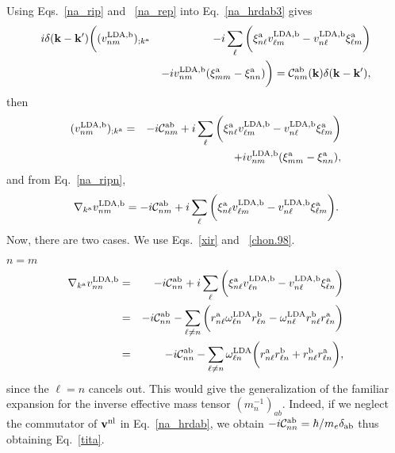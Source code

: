 Using Eqs.~\eqref{na_rip} and ~\eqref{na_rep}
into Eq.~\eqref{na_hrdab3} gives
\begin{eqnarray}\label{na_rapb}
i\delta(\mathbf{k}-\mathbf{k}')
\bigg(
(v^{\mathrm{LDA},\mathrm{b}}_{nm})_{;k^{\mathrm{a}}}
&&
-i
\sum_{\ell}
\bigg(
\xi^{\mathrm{a}}_{n\ell}
v^{\mathrm{LDA},\mathrm{b}}_{\ell m}
-
v^{\mathrm{LDA},\mathrm{b}}_{n\ell}
\xi^{\mathrm{a}}_{\ell m}
\bigg)
\nonumber \\
&&
-i
v^{\mathrm{LDA},\mathrm{b}}_{nm}(\xi^{\mathrm{a}}_{mm}
-
\xi^{\mathrm{a}}_{nn}
)
\bigg)
=
{\mathbf{\cal C}}^{\mathrm{a}\mathrm{b}}_{nm}(\mathbf{k})\delta(\mathbf{k}-\mathbf{k}')
,
\end{eqnarray}
then
\begin{eqnarray}\label{na_rapb2}
(v^{\mathrm{LDA},\mathrm{b}}_{nm})_{;k^{\mathrm{a}}}&=&
-i
{\mathbf{\cal C}}^{\mathrm{a}\mathrm{b}}_{nm}
+i
\sum_{\ell}
\bigg(
\xi^{\mathrm{a}}_{n\ell}
v^{\mathrm{LDA},\mathrm{b}}_{\ell m}
-
v^{\mathrm{LDA},\mathrm{b}}_{n\ell}
\xi^{\mathrm{a}}_{\ell m}
\bigg)
\nonumber \\
&&+i
v^{\mathrm{LDA},\mathrm{b}}_{nm}(\xi^{\mathrm{a}}_{mm}
-
\xi^{\mathrm{a}}_{nn}
)
,
\end{eqnarray}
and from Eq.~\eqref{na_ripn},
\begin{eqnarray}\label{ncogno}
\nabla_{k^{\mathrm{a}}}v^{\mathrm{LDA},\mathrm{b}}_{nm}=
-i{\mathbf{\cal C}}^{\mathrm{a}\mathrm{b}}_{nm}
+i
\sum_{\ell}
\bigg(
\xi^{\mathrm{a}}_{n\ell}
v^{\mathrm{LDA},\mathrm{b}}_{\ell m}
-
v^{\mathrm{LDA},\mathrm{b}}_{n\ell}
\xi^{\mathrm{a}}_{\ell m}
\bigg)
.
\end{eqnarray}
Now, there are two cases. We use Eqs.~\eqref{xir} and ~\eqref{chon.98}.

 $n=m$
\begin{eqnarray}\label{ntita}
\nabla_{k^{\mathrm{a}}}v^{\mathrm{LDA},\mathrm{b}}_{nn}&=&
-i{\mathbf{\cal C}}^{\mathrm{a}\mathrm{b}}_{nn}
+i
\sum_{\ell}
\bigg(
\xi^{\mathrm{a}}_{n\ell}
v^{\mathrm{LDA},\mathrm{b}}_{\ell n}
-
v^{\mathrm{LDA},\mathrm{b}}_{n\ell}
\xi^{\mathrm{a}}_{\ell n}
\bigg)
\nonumber\\
&=&
-i{\mathbf{\cal C}}^{\mathrm{a}\mathrm{b}}_{nn}
-
\sum_{\ell\ne n}
\bigg(
r^{\mathrm{a}}_{n\ell}
\omega^{\mathrm{LDA}}_{\ell n}
r^{\mathrm{b}}_{\ell n}
-
\omega^{\mathrm{LDA}}_{n\ell}
r^{\mathrm{b}}_{n\ell}
r^{\mathrm{a}}_{\ell n}
\bigg)
\nonumber\\
&=&
-i{\mathbf{\cal C}}^{\mathrm{a}\mathrm{b}}_{nn}
-
\sum_{\ell\ne n}
\omega^{\mathrm{LDA}}_{\ell n}
\bigg(
r^{\mathrm{a}}_{n\ell}
r^{\mathrm{b}}_{\ell n}
+
r^{\mathrm{b}}_{n\ell}
r^{\mathrm{a}}_{\ell n}
\bigg)
,
\end{eqnarray}
since the $\ell=n$ cancels out. This
would give the generalization of the familiar expansion for the inverse effective mass
tensor $(m_n^{-1})_{ab}$.\cite{ashcroft_solid_1976}
Indeed, if we neglect the commutator of $\mathbf{v}^{\mathrm{nl}}$ in
Eq.~\eqref{na_hrdab}, we obtain 
$-i{\mathbf{\cal C}}^{\mathrm{a}\mathrm{b}}_{nn}=\hbar/m_e\delta_{\mathrm{a}\mathrm{b}}$
thus obtaining Eq.~\eqref{tita}.

